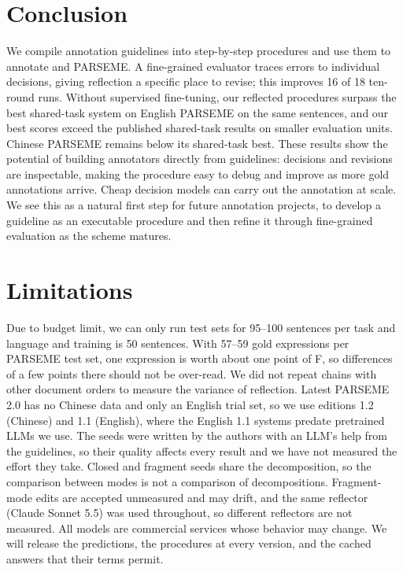 \section{Conclusion}
\label{sec:conclusion}

We compile annotation guidelines into step-by-step procedures and use them to annotate \umr and PARSEME. A fine-grained evaluator traces errors to individual decisions, giving reflection a specific place to revise; this improves 16 of 18 ten-round runs. Without supervised fine-tuning, our reflected procedures surpass the best shared-task system on English PARSEME on the same sentences, and our best \umr scores exceed the published shared-task results on smaller evaluation units. Chinese PARSEME remains below its shared-task best. These results show the potential of building annotators directly from guidelines: decisions and revisions are inspectable, making the procedure easy to debug and improve as more gold annotations arrive. Cheap decision models can carry out the annotation at scale. We see this as a natural first step for future annotation projects, to develop a guideline as an executable procedure and then refine it through fine-grained evaluation as the scheme matures.

\section*{Limitations}
Due to budget limit, we can only run test sets for 95--100 sentences per task and language and training is 50 sentences. With 57--59 gold expressions per PARSEME test set, one expression is worth about one point of F, so differences of a few points there should not be over-read. We did not repeat chains with other document orders to measure the variance of reflection. Latest PARSEME 2.0 has no Chinese data and only an English trial set, so we use editions 1.2 (Chinese) and 1.1 (English), where the English 1.1 systems predate pretrained LLMs we use. The seeds were written by the authors with an LLM's help from the guidelines, so their quality affects every result and we have not measured the effort they take. Closed and fragment seeds share the decomposition, so the comparison between modes is not a comparison of decompositions. Fragment-mode edits are accepted unmeasured and may drift, and the same reflector (Claude Sonnet 5.5) was used throughout, so different reflectors are not measured. All models are commercial services whose behavior may change. We will release the predictions, the procedures at every version, and the cached answers that their terms permit.

